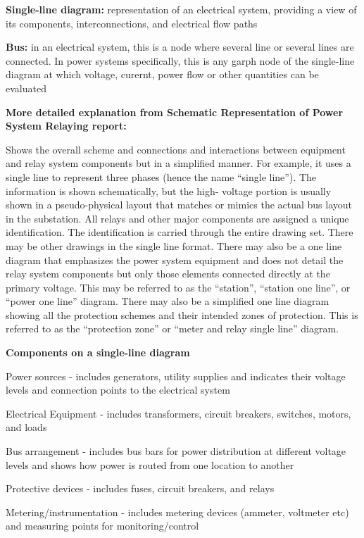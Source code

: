 \begin{define}
    \textbf{Single-line diagram:} representation of an electrical system, providing a view of its components, interconnections, and electrical flow paths

    \textbf{Bus:} in an electrical system, this is a node where several line or several lines are connected. In power systems specifically, this is any garph node of the single-line diagram at which voltage, curernt, power flow or other quantities can be evaluated
\end{define}
\textbf{More detailed explanation from Schematic Representation of Power System Relaying report:}

Shows the overall scheme and connections and interactions between equipment and relay system components but in a simplified manner. 
For example, it uses a single line to represent three phases (hence the name “single line”). 
The information is shown schematically, but the high- voltage portion is usually shown in a pseudo-physical layout that matches or mimics the actual bus layout in the substation. 
All relays and other major components are assigned a unique identification. 
The identification is carried through the entire drawing set. 
There may be other drawings in the single line format. 
There may also be a one line diagram that emphasizes the power system equipment and does not detail the relay system components but only those elements connected directly at the primary voltage. 
This may be referred to as the “station”, “station one line”, or “power one line” diagram. 
There may also be a simplified one line diagram showing all the protection schemes and their intended zones of protection. 
This is referred to as the “protection zone” or “meter and relay single line” diagram.

\textbf{Components on a single-line diagram}
\begin{pline}
    \item Power sources - includes generators, utility supplies and indicates their voltage levels and connection points to the electrical system
    \item Electrical Equipment - includes transformers, circuit breakers, switches, motors, and loads
    \item Bus arrangement - includes bus bars for power distribution at different voltage levels and shows how power is routed from one location to another
    \item Protective devices - includes fuses, circuit breakers, and relays
    \item Metering/instrumentation - includes metering devices (ammeter, voltmeter etc) and measuring points for monitoring/control
\end{pline}

